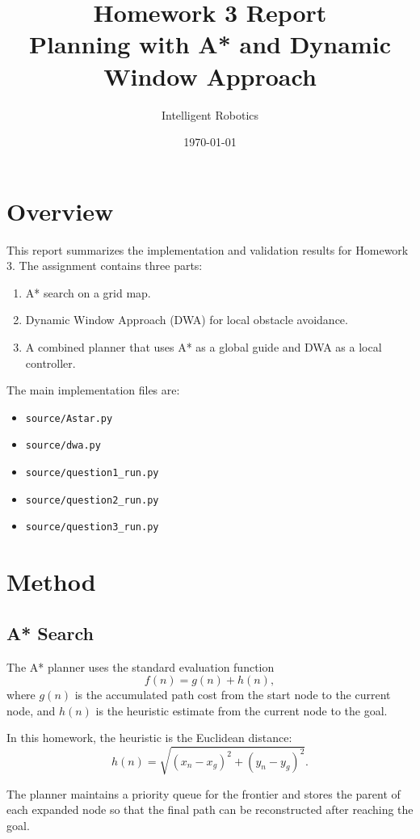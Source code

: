 \documentclass[11pt,a4paper]{article}
\title{Homework 3 Report\\Planning with A* and Dynamic Window Approach}
\author{Intelligent Robotics}
\date{\today}
\begin{document}
\maketitle

\section{Overview}

This report summarizes the implementation and validation results for Homework 3. The assignment contains three parts:

\begin{enumerate}
    \item A* search on a grid map.
    \item Dynamic Window Approach (DWA) for local obstacle avoidance.
    \item A combined planner that uses A* as a global guide and DWA as a local controller.
\end{enumerate}

The main implementation files are:

\begin{itemize}
    \item \texttt{source/Astar.py}
    \item \texttt{source/dwa.py}
    \item \texttt{source/question1\_run.py}
    \item \texttt{source/question2\_run.py}
    \item \texttt{source/question3\_run.py}
\end{itemize}

\section{Method}

\subsection{A* Search}

The A* planner uses the standard evaluation function
\[
f(n) = g(n) + h(n),
\]
where $g(n)$ is the accumulated path cost from the start node to the current node, and $h(n)$ is the heuristic estimate from the current node to the goal.

In this homework, the heuristic is the Euclidean distance:
\[
h(n) = \sqrt{(x_n - x_g)^2 + (y_n - y_g)^2}.
\]

The planner maintains a priority queue for the frontier and stores the parent of each expanded node so that the final path can be reconstructed after reaching the goal.
\end{document}
